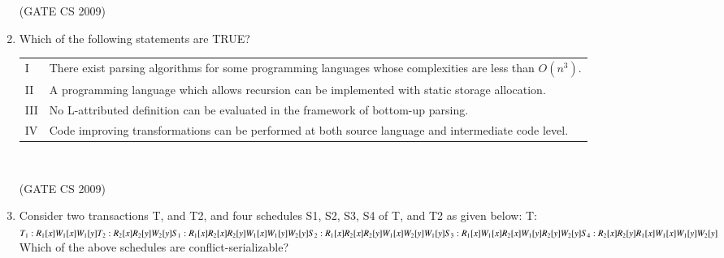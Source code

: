 \documentclass[a4paper, 11pt]{article}
\begin{document}
\begin{enumerate}
    \hfill (GATE CS 2009)
    
    \item Which of the following statements are TRUE?\\
    \begin{tabular}{ll}
        I & There exist parsing algorithms for some programming languages whose complexities are less than $O(n^3)$. \\
        II & A programming language which allows recursion can be implemented with static storage allocation.\\
        III & No L-attributed definition can be evaluated in the framework of bottom-up parsing. \\
        IV & Code improving transformations can be performed at both source language and intermediate code level.
    \end{tabular}\\
    \begin{enumerate}
    \end{enumerate}

    \hfill (GATE CS 2009)

    \item Consider two transactions T, and T2, and four schedules S1, S2, S3, S4 of T, and T2 as given below: T: \\
    $
    T_1: R_1[x] W_1[x] W_1[y]\\
    T_2: R_2[x] R_2[y] W_2[y]\\
    S_1: R_1[x] R_2[x] R_2[y] W_1[x] W_1[y] W_2[y] \\
    S_2: R_1[x] R_2[x] R_2[y] W_1[x] W_2[y] W_1[y]\\
    S_3: R_1[x] W_1[x] R_2[x] W_1[y] R_2[y] W_2[y]\\
    S_4: R_2[x] R_2[y] R_1[x] W_1[x] W_1[y] W_2[y]\\
    $
    Which of the above schedules are conflict-serializable?
    \begin{enumerate}
    \end{enumerate}


\end{enumerate}
\end{document}
